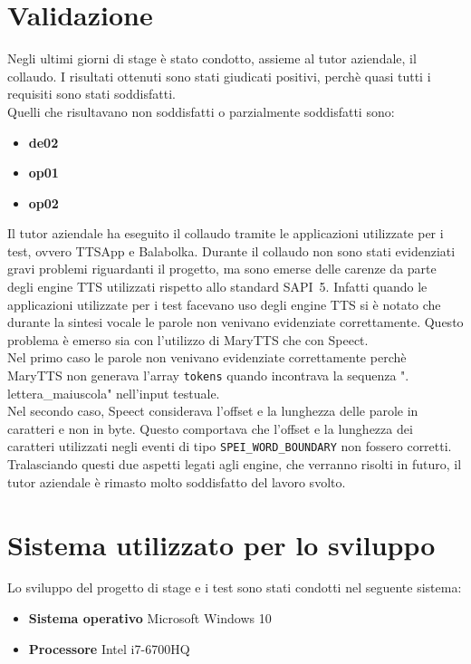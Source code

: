 \section{Validazione}
Negli ultimi giorni di stage è stato condotto, assieme al tutor aziendale, il collaudo.
I risultati ottenuti sono stati giudicati positivi, perchè quasi tutti i requisiti sono stati soddisfatti.\\
Quelli che risultavano non soddisfatti o parzialmente soddisfatti sono:
\begin{itemize}
	\item \textbf{de02}
	\item \textbf{op01}
	\item \textbf{op02}
\end{itemize}
Il tutor aziendale ha eseguito il collaudo tramite le applicazioni utilizzate per i test, ovvero TTSApp e Balabolka.
Durante il collaudo non sono stati evidenziati gravi problemi riguardanti il progetto, ma sono emerse delle carenze da parte degli engine TTS utilizzati rispetto allo standard SAPI~5.
Infatti quando le applicazioni utilizzate per i test facevano uso degli engine TTS si è notato che durante la sintesi vocale le parole non venivano evidenziate correttamente.
Questo problema è emerso sia con l'utilizzo di MaryTTS che con Speect.\\
Nel primo caso le parole non venivano evidenziate correttamente perchè MaryTTS non generava l'array \texttt{tokens} quando incontrava la sequenza ". lettera\_maiuscola" nell'input testuale.\\
Nel secondo caso, Speect considerava l'offset e la lunghezza delle parole in caratteri e non in byte. Questo comportava che l'offset e la lunghezza dei caratteri utilizzati negli eventi di tipo \texttt{SPEI\_WORD\_BOUNDARY} non fossero corretti.\\
Tralasciando questi due aspetti legati agli engine, che verranno risolti in futuro, il tutor aziendale è rimasto molto soddisfatto del lavoro svolto.

\section{Sistema utilizzato per lo sviluppo}
Lo sviluppo del progetto di stage e i test sono stati condotti nel seguente sistema:
\begin{itemize}
	\item \textbf{Sistema operativo} Microsoft Windows 10
	\item \textbf{Processore} Intel i7-6700HQ
\end{itemize}


